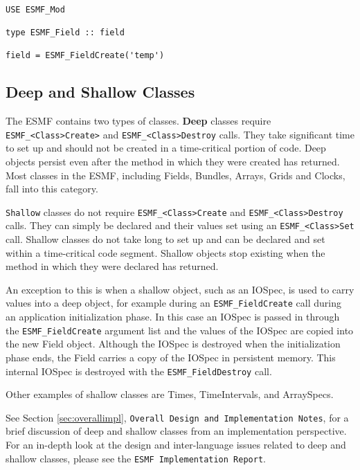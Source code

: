 \begin{verbatim}

USE ESMF_Mod

type ESMF_Field :: field

field = ESMF_FieldCreate('temp')

\end{verbatim}

\subsection{Deep and Shallow Classes}
\label{sec:deepshallow}

The ESMF contains two types of classes.  {\bf Deep} classes require
{\tt ESMF\_<Class>Create>} and {\tt ESMF\_<Class>Destroy} calls.
They take significant time to set up and should not be created
in a time-critical portion of code.  Deep objects persist 
even after the method in which they were created has returned.
Most classes in the ESMF, including Fields, Bundles, Arrays,
Grids and Clocks, fall into this category.

{\tt Shallow} classes do not require {\tt ESMF\_<Class>Create}
 and {\tt ESMF\_<Class>Destroy} calls.  They can simply be declared
and their values set using an {\tt ESMF\_<Class>Set} call.  Shallow
classes do not take long to set up and can be declared and set within
a time-critical code segment.  Shallow objects stop existing when
the method in which they were declared has returned.  

An exception to this is when a shallow object, such as an IOSpec, 
is used to carry values into a deep object, for example during an 
{\tt ESMF\_FieldCreate} call during an application initialization 
phase.  In this case an IOSpec is passed
in through the {\tt ESMF\_FieldCreate} argument list and the values 
of the IOSpec are copied into the new Field object.  Although the 
IOSpec is destroyed when the initialization phase ends, 
the Field carries a copy of the IOSpec in persistent memory.  This 
internal IOSpec is destroyed with the {\tt ESMF\_FieldDestroy} call.

Other examples of shallow classes are Times, TimeIntervals, and 
ArraySpecs.

See Section \ref{sec:overallimpl}, {\tt Overall Design and Implementation 
Notes}, for a brief discussion of deep and shallow classes from 
an implementation perspective.  For an in-depth look at the design 
and inter-language issues related to deep and shallow classes, please 
see the {\tt ESMF Implementation Report}.

